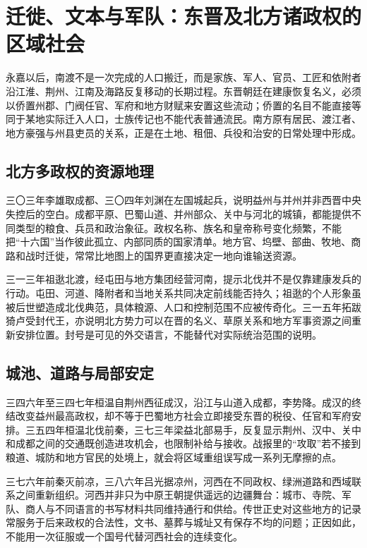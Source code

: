 \section{迁徙、文本与军队：东晋及北方诸政权的区域社会}
\label{sec:eastern-jin-regional-society-texts-mobility}

永嘉以后，南渡不是一次完成的人口搬迁，而是家族、军人、官员、工匠和依附者沿江淮、荆州、江南及海路反复移动的长期过程。东晋朝廷在建康恢复名义，必须以侨置州郡、门阀任官、军府和地方财赋来安置这些流动；侨置的名目不能直接等同于某地实际迁入人口，士族传记也不能代表普通流民。南方原有居民、渡江者、地方豪强与州县吏员的关系，正是在土地、租佃、兵役和治安的日常处理中形成。

\subsection{北方多政权的资源地理}

三〇三年李雄取成都、三〇四年刘渊在左国城起兵，说明益州与并州并非西晋中央失控后的空白。成都平原、巴蜀山道、并州部众、关中与河北的城镇，都能提供不同类型的粮食、兵员和政治象征。政权名称、族名和皇帝称号变化频繁，不能把“十六国”当作彼此孤立、内部同质的国家清单。地方官、坞壁、部曲、牧地、商路和战时迁徙，常常比地图上的国界更直接决定一地向谁输送资源。

三一三年祖逖北渡，经屯田与地方集团经营河南，提示北伐并不是仅靠建康发兵的行动。屯田、河道、降附者和当地关系共同决定前线能否持久；祖逖的个人形象虽被后世塑造成北伐典范，具体粮源、人口和控制范围不应被传奇化。三一五年拓跋猗卢受封代王，亦说明北方势力可以在晋的名义、草原关系和地方军事资源之间重新安排位置。封号是可见的外交语言，不能替代对实际统治范围的说明。

\subsection{城池、道路与局部安定}

三四六年至三四七年桓温自荆州西征成汉，沿江与山道入成都，李势降。成汉的终结改变益州最高政权，却不等于巴蜀地方社会立即接受东晋的税役、任官和军府安排。三五四年桓温北伐前秦，三七三年梁益北部易手，反复显示荆州、汉中、关中和成都之间的交通既创造进攻机会，也限制补给与接收。战报里的“攻取”若不接到粮道、城防和地方官民的处境上，就会将区域重组误写成一系列无摩擦的点。

三七六年前秦灭前凉，三八六年吕光据凉州，河西在不同政权、绿洲道路和西域联系之间重新组织。河西并非只为中原王朝提供遥远的边疆舞台：城市、寺院、军队、商人与不同语言的书写材料共同维持通行和供给。传世正史对这些地方的记录常服务于后来政权的合法性，文书、墓葬与城址又有保存不均的问题；正因如此，不能用一次征服或一个国号代替河西社会的连续变化。

